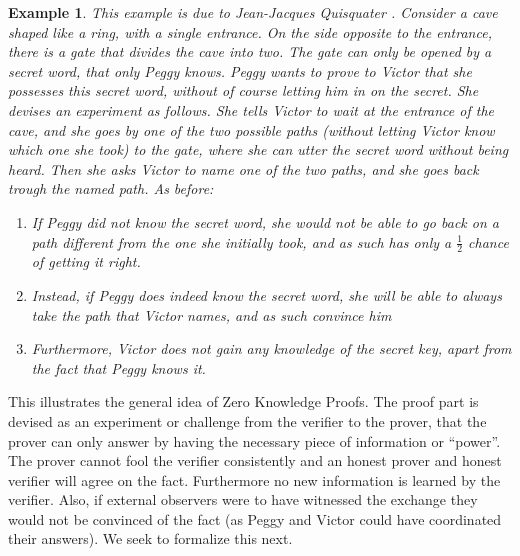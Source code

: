 \documentclass{article}
\newtheorem{example}{Example}
\begin{document}
\begin{example}
    This example is due to Jean-Jacques Quisquater \cite{quisquaterHowExplainZeroknowledge1989}.
    Consider a cave shaped like a ring, with a single entrance.
    On the side opposite to the entrance, there is a gate that divides the cave into two.
    The gate can only be opened by a secret word, that only Peggy knows.
    Peggy wants to prove to Victor that she possesses this secret word, without of course letting him in on the secret.
    She devises an experiment as follows.
    She tells Victor to wait at the entrance of the cave, and she goes by one of the two possible paths (without letting Victor know which one she took) to the gate, where she can utter the secret word without being heard.
    Then she asks Victor to name one of the two paths, and she goes back trough the named path.
    As before:
    \begin{enumerate}
        \item If Peggy did not know the secret word, she would not be able to go back on a path different from the one she initially took, and as such has only a $\frac{1}{2}$ chance of getting it right.
        \item Instead, if Peggy does indeed know the secret word, she will be able to always take the path that Victor names, and as such convince him
        \item Furthermore, Victor does not gain any knowledge of the secret key, apart from the fact that Peggy knows it.
    \end{enumerate}
\end{example}

This illustrates the general idea of Zero Knowledge Proofs. The proof part is devised as an experiment or challenge from the verifier to the prover, that the prover can only answer by having the necessary piece of information or \enquote{power}. The prover cannot fool the verifier consistently and an honest prover and honest verifier will agree on the fact. Furthermore no new information is learned by the verifier. Also, if external observers were to have witnessed the exchange they would not be convinced of the fact (as Peggy and Victor could have coordinated their answers).
We seek to formalize this next.
\end{document}
